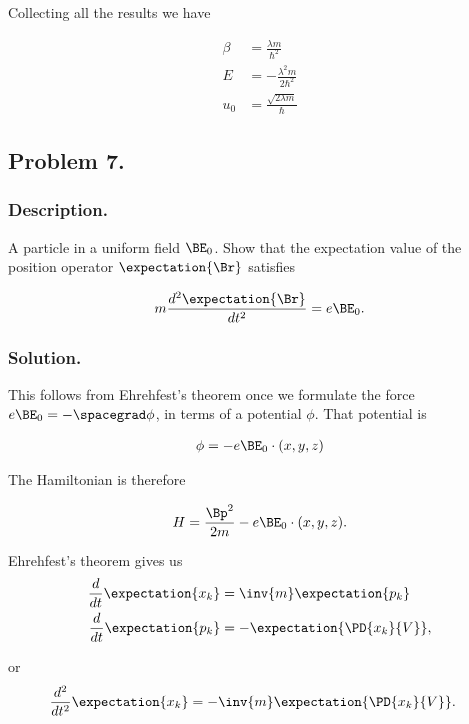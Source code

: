 Collecting all the results we have

\begin{align}\label{eqn:desaiCh3:705}
\beta &= \frac{\lambda m}{\hbar^2} \\
E &= -\frac{\lambda^2 m}{2 \hbar^2} \\
u_0 &= \frac{\sqrt{2 \lambda m}}{\hbar}
\end{align}

\subsection{Problem 7. }
\subsubsection{Description. }

A particle in a uniform field $\BE_0$.  Show that the expectation value of the position operator $\expectation{\Br}$ satisfies

\begin{align}\label{eqn:desaiCh3:600}
m \frac{d^2 \expectation{\Br} }{dt^2} = e \BE_0.
\end{align}

\subsubsection{Solution. }

This follows from Ehrehfest's theorem once we formulate the force $e \BE_0 = -\spacegrad \phi$, in terms of a potential $\phi$.  That potential is

\begin{align}\label{eqn:desaiCh3:601}
\phi = - e \BE_0 \cdot (x,y,z)
\end{align}

The Hamiltonian is therefore

\begin{align}\label{eqn:desaiCh3:602}
H = \frac{\Bp^2}{2m} - e \BE_0 \cdot (x,y,z).
\end{align}

Ehrehfest's theorem gives us
\begin{align*}
\frac{d}{dt} \expectation{x_k} &= \inv{m} \expectation{p_k} \\
\frac{d}{dt} \expectation{p_k} &= -\expectation{ \PD{x_k}{V} },
\end{align*}

or
\begin{align}\label{eqn:desaiCh3:603}
\frac{d^2}{dt^2} \expectation{x_k} &= -\inv{m} \expectation{ \PD{x_k}{V} }.
\end{align}

